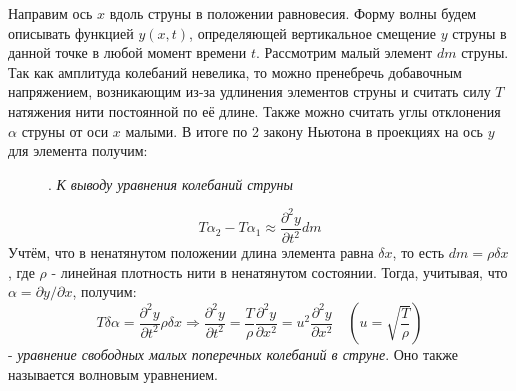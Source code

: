 \documentclass[a4paper]{article}
\begin{document}
\noindent
Направим ось $x$ вдоль струны в положении равновесия. Форму волны будем описывать функцией $y(x,t)$, определяющей вертикальное смещение $y$ струны в данной точке в любой момент времени $t$. Рассмотрим малый элемент $dm$ струны. Так как амплитуда колебаний невелика, то можно пренебречь добавочным напряжением, возникающим из-за удлинения элементов струны и считать силу $T$ натяжения нити постоянной по её длине. Также можно считать углы отклонения $\alpha$ струны от оси $x$ малыми. В итоге по 2 закону Ньютона в проекциях на ось $y$ для элемента получим:
\begin{figure}
\caption{. \textit{К выводу уравнения колебаний струны}}
\end{figure}
\begin{equation}
T \alpha_2 - T \alpha_1 \approx \frac{\partial^2 y}{\partial t^2} dm
\end{equation}
Учтём, что в ненатянутом положении длина элемента равна $\delta x$, то есть $dm = \rho \delta x$, где $\rho$ - линейная плотность нити в ненатянутом состоянии. Тогда, учитывая, что $\alpha = \partial y/\partial x$, получим:
\begin{equation}
T\delta \alpha = \frac{\partial^2 y}{\partial t^2} \rho \delta x \Rightarrow \frac{\partial^2 y}{\partial t^2} = \frac{T}{\rho} \frac{\partial^2 y}{\partial x^2} = u^2 \frac{\partial^2 y}{\partial x^2} \quad \left(u = \sqrt{\frac{T}{\rho}}\right)
\end{equation} 
- \textit{уравнение свободных малых поперечных колебаний в струне}. Оно также называется волновым уравнением.
\end{document}
